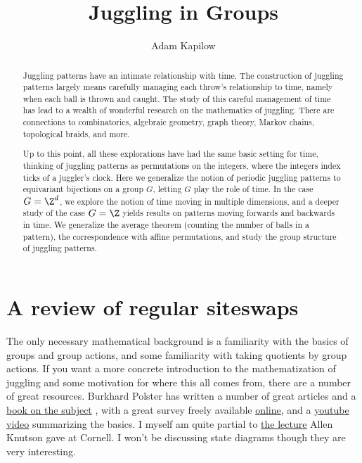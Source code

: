 \documentclass[12nt]{article}
\theoremstyle{plain}
\begin{document}
\title{Juggling in Groups}
\author{Adam Kapilow}
\maketitle

\newpage
\tableofcontents
\newpage

\begin{abstract}
Juggling patterns have an intimate relationship with time. The construction of juggling patterns largely means carefully managing each throw's relationship to time, namely when each ball is thrown and caught. The study of this careful management of time has lead to a wealth of wonderful research on the mathematics of juggling. There are connections to combinatorics, algebraic geometry, graph theory, Markov chains, topological braids, and more. 

Up to this point, all these explorations have had the same basic setting for time, thinking of juggling patterns as permutations on the integers, where the integers index ticks of a juggler's clock. Here we generalize the notion of periodic juggling patterns to equivariant bijections on a group $G$, letting $G$ play the role of time. In the case $G = \Z^d$, we explore the notion of time moving in multiple dimensions, and a deeper study of the case $G = \Z$ yields results on patterns moving forwards and backwards in time. We generalize the average theorem (counting the number of balls in a pattern), the correspondence with affine permutations, and study the group structure of juggling patterns.
\end{abstract}

\section{A review of regular siteswaps}




The only necessary mathematical background is a familiarity with the basics of groups and group actions, and some familiarity with taking quotients by group actions. If you want a more concrete introduction to the mathematization of juggling and some motivation for where this all comes from, there are a number of great resources. Burkhard Polster has written a number of great articles and a \underline{\textcolor{blue}{\href{https://www.qedcat.com/books.html}{book on the subject}}} \cite{polster_book}, with a great survey freely available \underline{\textcolor{blue}{\href{https://www.qedcat.com/articles/juggling_survey.pdf}{online}}}, and a \underline{\textcolor{blue}{\href{https://youtu.be/VsQ-OPIZ5kg}{youtube video}}} summarizing the basics. I myself am quite partial to \underline{\textcolor{blue}{\href{https://youtu.be/38rf9FLhl-8}{the lecture}}} Allen Knutson gave at Cornell. I won't be discussing state diagrams though they are very interesting.
\end{document}
